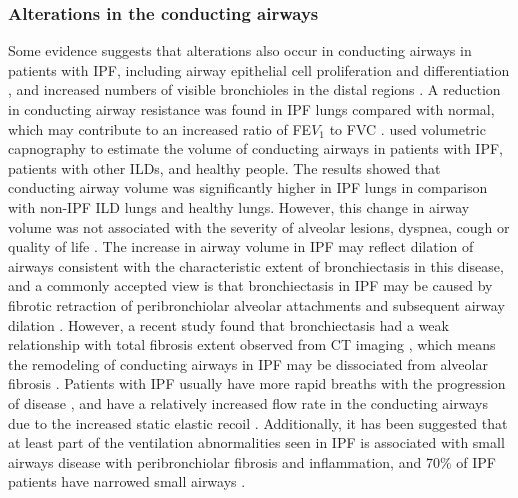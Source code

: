 \subsubsection{Alterations in the conducting airways}
Some evidence suggests that alterations also occur in conducting airways in patients with IPF, including airway epithelial cell proliferation \citep{vuorinen2008peroxiredoxin} and differentiation \citep{plantier2016increased}, and increased numbers of visible bronchioles in the distal regions \citep{chilosi2002abnormal}. A reduction in conducting airway resistance was found in IPF lungs compared with normal, which may contribute to an increased ratio of FE$V_1$ to FVC \citep{pastre2015different}. \cite{plantier2016increased} used volumetric capnography to estimate the volume of conducting airways in patients with IPF, patients with other ILDs, and healthy people. The results showed that conducting airway volume was significantly higher in IPF lungs in comparison with non-IPF ILD lungs and healthy lungs. However, this change in airway volume was not associated with the severity of alveolar lesions, dyspnea, cough or quality of life \citep{plantier2016increased}. The increase in airway volume in IPF may reflect dilation of airways consistent with the characteristic extent of bronchiectasis in this disease, and a commonly accepted view is that bronchiectasis in IPF may be caused by fibrotic retraction of peribronchiolar alveolar attachments and subsequent airway dilation \citep{sumikawa2008computed}. However, a recent study found that bronchiectasis had a weak relationship with total fibrosis extent observed from CT imaging \citep{walsh2015relationship}, which means the remodeling of conducting airways in IPF may be dissociated from alveolar fibrosis \citep{plantier2016increased}. Patients with IPF usually have more rapid breaths with the progression of disease \citep{ kornbluth1980respiratory, renzi1982pattern}, and have a relatively increased flow rate in the conducting airways due to the increased static elastic recoil \citep{american2000idiopathic}. Additionally, it has been suggested that at least part of the ventilation abnormalities seen in IPF is associated with small airways disease with peribronchiolar fibrosis and inflammation, and 70\% of IPF patients have narrowed small airways \citep{crystal1976idiopathic}.

